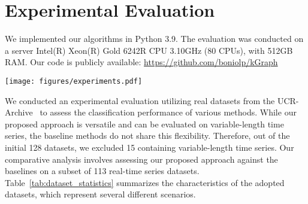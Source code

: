 \section{Experimental Evaluation}
\label{sec:exp}

\label{sec:setup}

\noindent{\bf [Setup]} We implemented our algorithms in Python 3.9. The evaluation was conducted on a server Intel(R) Xeon(R) Gold 6242R CPU 3.10GHz (80 CPUs), with 512GB RAM.
Our code is publicly available: \url{https://github.com/boniolp/kGraph}

\begin{figure*}[tb]
 \centering
\texttt{[image: figures/experiments.pdf]}

 \caption{}
 \vspace{-0.3cm}
 \label{fig:experiments_effectiveness_figures}

\end{figure*}

\label{sec:configuration_data_baseline}
\noindent{\bf [Datasets]} We conducted an experimental evaluation utilizing real datasets from the UCR-Archive~\cite{Dau2018TheUT} to assess the classification performance of various methods. While our proposed approach is versatile and can be evaluated on variable-length time series, the baseline methods do not share this flexibility. Therefore, out of the initial 128 datasets, we excluded 15 containing variable-length time series. Our comparative analysis involves assessing our proposed approach against the baselines on a subset of 113 real-time series datasets.
Table~\ref{tab:dataset_statistics} summarizes the characteristics of the adopted datasets, 
which represent several different scenarios. 


